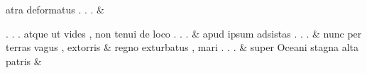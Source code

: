 \documentclass[12pt,onecolumn,twoside,a4paper]{memoir}
\begin{document}
\begin{pairs}
\begin{Leftside}
                              atra
                              deformatus
                              .
                              .
                              . \&
                         \stanza {}
                     
                              .
                              .
                              .
                              atque
                              ut
                              vides
                              ,
                              non
                              tenui
                              de
                              loco
                              .
                              .
                              . \&
                         \stanza {}
                     apud
                              ipsum
                              adsistas
                              .
                              .
                              . \&
                         \stanza {}nunc
                              per
                              terras
                              vagus
                              ,
                              extorris & 
                     regno
                              exturbatus
                              ,
                              mari
                              .
                              .
                              . \&
                         \stanza {}super
                              Oceani
                              stagna
                              alta
                              patris & 
                     

\end{Leftside}
\end{pairs}
\end{document}
